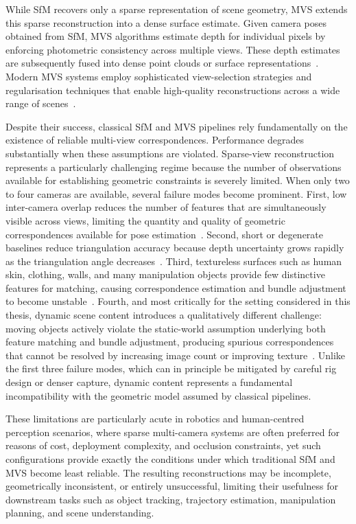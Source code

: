 While SfM recovers only a sparse representation of scene geometry, MVS extends this sparse reconstruction into a dense surface estimate. Given camera poses obtained from SfM, MVS algorithms estimate depth for individual pixels by enforcing photometric consistency across multiple views. These depth estimates are subsequently fused into dense point clouds or surface representations~\cite{schoenberger2016mvs,seitz2006comparison}. Modern MVS systems employ sophisticated view-selection strategies and regularisation techniques that enable high-quality reconstructions across a wide range of scenes~\cite{schoenberger2016mvs}.

Despite their success, classical SfM and MVS pipelines rely fundamentally on the existence of reliable multi-view correspondences. Performance degrades substantially when these assumptions are violated. Sparse-view reconstruction represents a particularly challenging regime because the number of observations available for establishing geometric constraints is severely limited. When only two to four cameras are available, several failure modes become prominent.
First, low inter-camera overlap reduces the number of features that are simultaneously visible across views, limiting the quantity and quality of geometric correspondences available for pose estimation~\cite{hartley2004multiple,pataki2025mpsfmmonocularsurfacepriors}. Second, short or degenerate baselines reduce triangulation accuracy because depth uncertainty grows rapidly as the triangulation angle decreases~\cite{hartley2004multiple,schoenberger2016sfm}. Third, textureless surfaces such as human skin, clothing, walls, and many manipulation objects provide few distinctive features for matching, causing correspondence estimation and bundle adjustment to become unstable~\cite{dust3r,mast3r}. Fourth, and most critically for the setting considered in this thesis, dynamic scene content introduces a qualitatively different challenge: moving objects actively violate the static-world assumption underlying both feature matching and bundle adjustment, producing spurious correspondences that cannot be resolved by increasing image count or improving texture~\cite{Cin_2025_CVPR}. Unlike the first three failure modes, which can in principle be mitigated by careful rig design or denser capture, dynamic content represents a fundamental incompatibility with the geometric model assumed by classical pipelines.

These limitations are particularly acute in robotics and human-centred perception scenarios, where sparse multi-camera systems are often preferred for reasons of cost, deployment complexity, and occlusion constraints, yet such configurations provide exactly the conditions under which traditional SfM and MVS become least reliable. The resulting reconstructions may be incomplete, geometrically inconsistent, or entirely unsuccessful, limiting their usefulness for downstream tasks such as object tracking, trajectory estimation, manipulation planning, and scene understanding.

